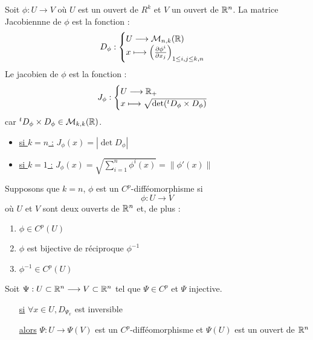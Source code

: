 \begin{definition}
    Soit $ \phi : U \rightarrow V$ où $U$ est un ouvert de $R^k$ et $V$ un ouvert de $\mathbb{R}^n$. La matrice Jacobiennne de $\phi$ est la fonction :
        \[ D_\phi :
            \begin{cases}
                U \longrightarrow \mathcal{M}_{n,k}(\mathbb{R}) \\
                x \longmapsto \Bigl( \frac{\partial \phi ^i}{\partial x_j} \Bigr) _{1 \leq i,j \leq k,n}
            \end{cases} \] 
    Le jacobien de $\phi$ est la fonction :
        \[ J_\phi :
            \begin{cases}
                U \longrightarrow \mathbb{R}_+ \\ 
                x \longmapsto \sqrt{\det (^t D_\phi \times D_\phi)}
            \end{cases}
        \]
        car $^t D_\phi \times D_\phi \in \mathcal{M}_{k,k}(\mathbb{R})$.
    \begin{itemize}
        \item \underline{si $k = n$ :} $ \boxed{J_\phi(x) = | \det D_\phi |} $
        \item \underline{si $ k =1$ :} $ J_\phi(x) = \sqrt{\sum_{i=1}^{n} \phi^{i}(x)} = \| \phi'(x) \|$  
    \end{itemize}
\end{definition}

\begin{definition}[$C^p$-difféomorphisme]
    Supposons que $k=n$, $\phi$ est un $C^p$-difféomorphisme si 
    \[ \phi : U \longrightarrow V \]
    où $U$ et $V$ sont deux ouverts de $\mathbb{R}^n$ et, de plus :
    \begin{enumerate}
        \item $\phi \in C^p(U)$ 
        \item $\phi$ est bijective de réciproque $\phi^{-1}$
        \item $\phi^{-1} \in C^p(U)$ 
    \end{enumerate}
\end{definition}

\begin{theorem}
    Soit $\Psi : U \subset \mathbb{R}^n \longrightarrow V \subset \mathbb{R}^n$ tel que $\Psi \in C^p$ et $\Psi$ injective. 
    \begin{itemize}
        \item[\underline{si}] $ \forall x \in U, D_{\Psi_x}$ est inversible
        \item[\underline{alors}]  $\Psi : U \longrightarrow \Psi(V)$ est un $C^p$-difféomorphisme et $\Psi(U)$ est un ouvert de $\mathbb{R}^n$
    \end{itemize}
\end{theorem}

